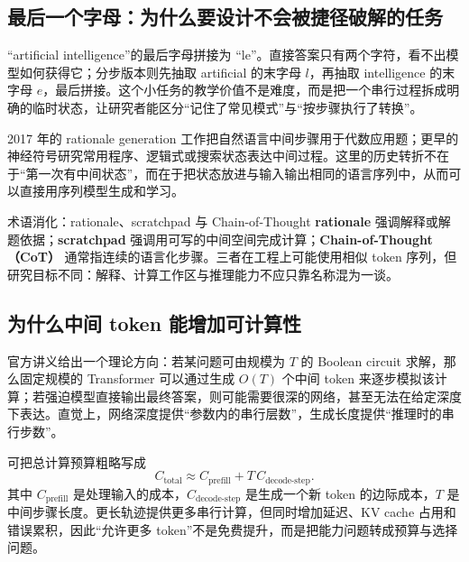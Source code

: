 \subsection{最后一个字母：为什么要设计不会被捷径破解的任务}

“artificial intelligence”的最后字母拼接为 “le”。直接答案只有两个字符，看不出模型如何获得它；分步版本则先抽取 artificial 的末字母 $l$，再抽取 intelligence 的末字母 $e$，最后拼接。这个小任务的教学价值不是难度，而是把一个串行过程拆成明确的临时状态，让研究者能区分“记住了常见模式”与“按步骤执行了转换”。



2017 年的 rationale generation 工作把自然语言中间步骤用于代数应用题；更早的神经符号研究常用程序、逻辑式或搜索状态表达中间过程。这里的历史转折不在于“第一次有中间状态”，而在于把状态放进与输入输出相同的语言序列中，从而可以直接用序列模型生成和学习。


\begin{knowledgebox}{术语消化：rationale、scratchpad 与 Chain-of-Thought}
\textbf{rationale} 强调解释或解题依据；\textbf{scratchpad} 强调用可写的中间空间完成计算；\textbf{Chain-of-Thought（CoT）} 通常指连续的语言化步骤。三者在工程上可能使用相似 token 序列，但研究目标不同：解释、计算工作区与推理能力不应只靠名称混为一谈。
\end{knowledgebox}

\subsection{为什么中间 token 能增加可计算性}

官方讲义给出一个理论方向：若某问题可由规模为 $T$ 的 Boolean circuit 求解，那么固定规模的 Transformer 可以通过生成 $O(T)$ 个中间 token 来逐步模拟该计算；若强迫模型直接输出最终答案，则可能需要很深的网络，甚至无法在给定深度下表达。直觉上，网络深度提供“参数内的串行层数”，生成长度提供“推理时的串行步数”。


可把总计算预算粗略写成
\[
C_{\text{total}}\approx C_{\text{prefill}}+T\,C_{\text{decode-step}}.
\]
其中 $C_{\text{prefill}}$ 是处理输入的成本，$C_{\text{decode-step}}$ 是生成一个新 token 的边际成本，$T$ 是中间步骤长度。更长轨迹提供更多串行计算，但同时增加延迟、KV cache 占用和错误累积，因此“允许更多 token”不是免费提升，而是把能力问题转成预算与选择问题。

